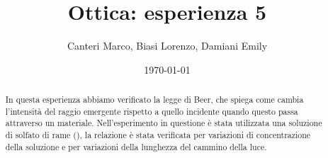 \documentclass[letterpaper,11pt]{article}
\title{\textbf{Ottica:} esperienza 5}
\author{Canteri Marco, Biasi Lorenzo, Damiani Emily}
\date{\today}
\begin{document}
\maketitle

\begin{abstract}
\hspace{-1.9em}
In questa esperienza abbiamo verificato la legge di Beer, che spiega come cambia l'intensità del raggio emergente rispetto a quello incidente quando questo passa attraverso un materiale. Nell'esperimento in questione è stata utilizzata una soluzione di solfato di rame (), la relazione è stata verificata per variazioni di concentrazione della soluzione e per variazioni della lunghezza del cammino della luce.
\end{abstract}

\begin{body}

\end{body}
\end{document}
